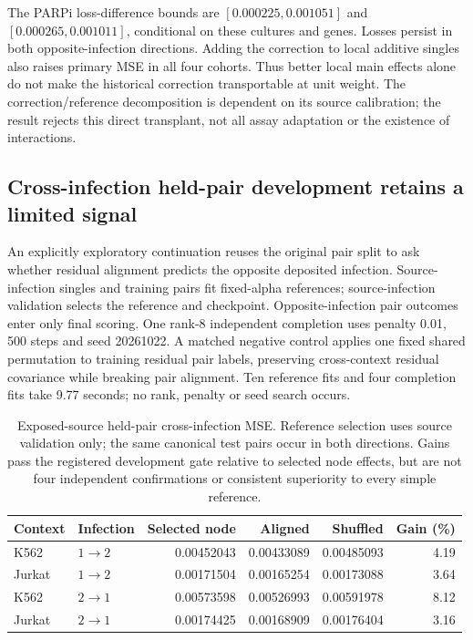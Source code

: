 The PARPi loss-difference bounds are $[0.000225,0.001051]$ and $[0.000265,0.001011]$, conditional on these cultures and genes. Losses persist in both opposite-infection directions. Adding the correction to local additive singles also raises primary MSE in all four cohorts. Thus better local main effects alone do not make the historical correction transportable at unit weight. The correction/reference decomposition is dependent on its source calibration; the result rejects this direct transplant, not all assay adaptation or the existence of interactions.

\subsection{Cross-infection held-pair development retains a limited signal}
An explicitly exploratory continuation reuses the original pair split to ask whether residual alignment predicts the opposite deposited infection. Source-infection singles and training pairs fit fixed-alpha references; source-infection validation selects the reference and checkpoint. Opposite-infection pair outcomes enter only final scoring. One rank-8 independent completion uses penalty 0.01, 500 steps and seed 20261022. A matched negative control applies one fixed shared permutation to training residual pair labels, preserving cross-context residual covariance while breaking pair alignment. Ten reference fits and four completion fits take 9.77 seconds; no rank, penalty or seed search occurs.

\begin{table}[htbp]\centering\small
\begin{tabular}{llrrrr}\toprule
Context & Infection & Selected node & Aligned & Shuffled & Gain (\%)\\\midrule
K562 & $1\to2$ & 0.00452043 & 0.00433089 & 0.00485093 & 4.19\\
Jurkat & $1\to2$ & 0.00171504 & 0.00165254 & 0.00173088 & 3.64\\
K562 & $2\to1$ & 0.00573598 & 0.00526993 & 0.00591978 & 8.12\\
Jurkat & $2\to1$ & 0.00174425 & 0.00168909 & 0.00176404 & 3.16\\\bottomrule
\end{tabular}
\caption{Exposed-source held-pair cross-infection MSE. Reference selection uses source validation only; the same canonical test pairs occur in both directions. Gains pass the registered development gate relative to selected node effects, but are not four independent confirmations or consistent superiority to every simple reference.}
\label{tab:growth-infections}\end{table}

